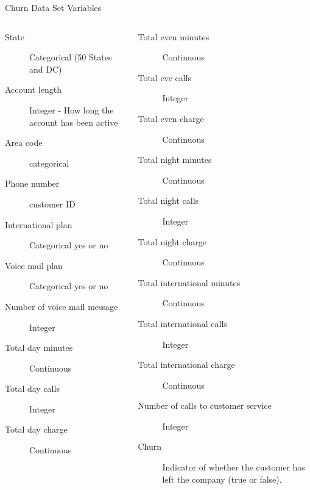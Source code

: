 \documentclass[handout]{beamer}
\begin{document}
\begin{frame}[t]{Churn Data Set Variables}
\begin{columns}
   {\scriptsize
   \begin{description}
     \item[State] Categorical (50 States and DC)
     \item[Account length] Integer - How long the account has been active
     \item[Area code] categorical
     \item[Phone number] customer ID
     \item[International plan] Categorical yes or no
     \item[Voice mail plan] Categorical yes or no
     \item[Number of voice mail message] Integer
     \item[Total day minutes] Continuous
     \item[Total day calls] Integer
     \item[Total day charge] Continuous
   \end{description}
   }
   {\scriptsize
   \begin{description}
     \item[Total even minutes] Continuous
     \item[Total eve calls] Integer
     \item[Total even charge] Continuous
     \item[Total night minutes] Continuous
     \item[Total night calls] Integer
     \item[Total night charge] Continuous
     \item[Total international minutes] Continuous
     \item[Total international calls] Integer
     \item[Total international charge] Continuous
     \item[Number of calls to customer service] Integer
     \item[Churn] Indicator of whether the customer has left the company (true or false).
  \end{description}
  }
\end{columns}
\end{frame}
\end{document}
